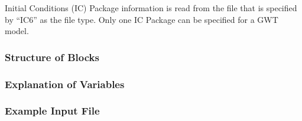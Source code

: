 Initial Conditions (IC) Package information is read from the file that is specified by ``IC6'' as the file type.  Only one IC Package can be specified for a GWT model. 

\vspace{5mm}
\subsubsection{Structure of Blocks}



\vspace{5mm}
\subsubsection{Explanation of Variables}
\begin{description}

\end{description}

\vspace{5mm}
\subsubsection{Example Input File}


